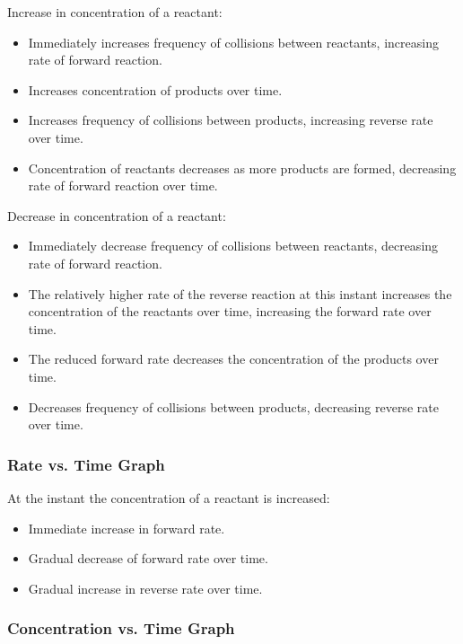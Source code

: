 \documentclass[a4paper,11pt]{article}
\begin{document}
Increase in concentration of a reactant:

\begin{itemize}
\item Immediately increases frequency of collisions between reactants,
	increasing rate of forward reaction.
\item Increases concentration of products over time.
\item Increases frequency of collisions between products, increasing reverse
	rate over time.
\item Concentration of reactants decreases as more products are formed,
	decreasing rate of forward reaction over time.
\end{itemize}

Decrease in concentration of a reactant:

\begin{itemize}
\item Immediately decrease frequency of collisions between reactants, decreasing
	rate of forward reaction.
\item The relatively higher rate of the reverse reaction at this instant
	increases the concentration of the reactants over time, increasing the
	forward rate over time.
\item The reduced forward rate decreases the concentration of the products
	over time.
\item Decreases frequency of collisions between products, decreasing reverse
	rate over time.
\end{itemize}


\subsubsection{Rate vs. Time Graph}

At the instant the concentration of a reactant is increased:

\begin{itemize}
\item Immediate increase in forward rate.
\item Gradual decrease of forward rate over time.
\item Gradual increase in reverse rate over time.
\end{itemize}


\subsubsection{Concentration vs. Time Graph}
\end{document}
